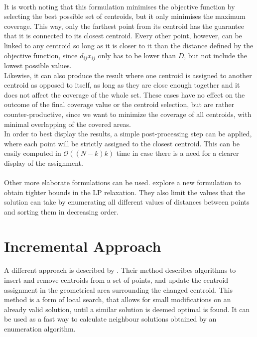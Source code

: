 \paragraph{}
It is worth noting that this formulation minimises the objective function by selecting the best possible set of centroids, but it only minimises the maximum coverage. This way, only the farthest point from its centroid has the guarantee that it is connected to its closest centroid.
Every other point, however, can be linked to any centroid so long as it is closer to it than the distance defined by the objective function, since $d_{ij}x_{ij}$ only has to be lower than $D$, but not include the lowest possible values.\\
Likewise, it can also produce the result where one centroid is assigned to another centroid as opposed to itself, as long as they are close enough together and it does not affect the coverage of the whole set.
These cases have no effect on the outcome of the final coverage value or the centroid selection, but are rather counter-productive, since we want to minimize the coverage of all centroids, with minimal overlapping of the covered areas.\\
In order to best display the results, a simple post-processing step can be applied, where each point will be strictly assigned to the closest centroid. This can be easily computed in $\mathcal{O}((N-k)k)$ time in case there is a need for a clearer display of the assignment.

\paragraph{}
Other more elaborate formulations can be used. \citet{linearprog} explore a new formulation to obtain tighter bounds in the LP relaxation. They also limit the values that the solution can take by enumerating all different values of distances between points and sorting them in decreasing order.

\section{Incremental Approach}
\paragraph{}
A different approach is described by \citet{incrementalcov}. Their method describes algorithms to insert and remove centroids from a set of points, and update the centroid assignment in the geometrical area surrounding the changed centroid. This method is a form of local search, that allows for small modifications on an already valid solution, until a similar solution is deemed optimal is found. It can be used as a fast way to calculate neighbour solutions obtained by an enumeration algorithm.

